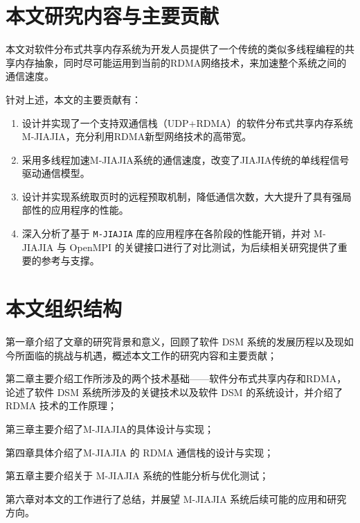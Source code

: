 {  \section{本文研究内容与主要贡献}
  本文对软件分布式共享内存系统为开发人员提供了一个传统的类似多线程编程的共享内存抽象，同时尽可能运用到当前的RDMA网络技术，来加速整个系统之间的通信速度。

  针对上述，本文的主要贡献有：
  \begin{enumerate}[leftmargin=1em, align=left]
    \item 设计并实现了一个支持双通信栈（UDP+RDMA）的软件分布式共享内存系统 M-JIAJIA，充分利用RDMA新型网络技术的高带宽。
    \item 采用多线程加速M-JIAJIA系统的通信速度，改变了JIAJIA传统的单线程信号驱动通信模型。
    \item 设计并实现系统取页时的远程预取机制，降低通信次数，大大提升了具有强局部性的应用程序的性能。
    \item 深入分析了基于 \texttt{M-JIAJIA} 库的应用程序在各阶段的性能开销，并对 M-JIAJIA 与 OpenMPI 的关键接口进行了对比测试，为后续相关研究提供了重要的参考与支撑。
  \end{enumerate}
  \section{本文组织结构}
  第一章介绍了文章的研究背景和意义，回顾了软件 DSM 系统的发展历程以及现如今所面临的挑战与机遇，概述本文工作的研究内容和主要贡献；

  第二章主要介绍工作所涉及的两个技术基础——软件分布式共享内存和RDMA，论述了软件 DSM 系统所涉及的关键技术以及软件 DSM 的系统设计，并介绍了 RDMA 技术的工作原理；

  第三章主要介绍了M-JIAJIA的具体设计与实现；

  第四章具体介绍了M-JIAJIA 的 RDMA 通信栈的设计与实现；

  第五章主要介绍关于 M-JIAJIA 系统的性能分析与优化测试；

  第六章对本文的工作进行了总结，并展望 M-JIAJIA 系统后续可能的应用和研究方向。
}
